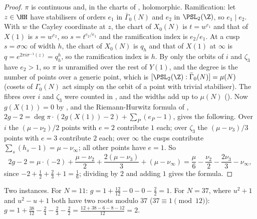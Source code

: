 \begin{proof}
$\pi$ is continuous and, in the charts of , holomorphic. Ramification: let $z\in\HH$ have stabilisers of orders $e_1$ in
$\bar\Gamma_0(N)$ and $e_2$ in $\PSL_2(\Z)$, so $e_1\mid e_2$. With $w$ the Cayley coordinate at $z$, the chart of $X_0(N)$ is $t=w^{e_1}$ and that of $X(1)$ is $s=w^{e_2}$, so
$s=t^{e_2/e_1}$ and the ramification index is $e_2/e_1$. At a cusp $s=\sigma\infty$ of width $h$, the chart of $X_0(N)$ is $q_h$ and that of $X(1)$ at $\infty$ is
$q=e^{2\pi i\sigma^{-1}(z)}=q_h^h$, so the ramification index is $h$. By  only the orbits of $i$ and $\zeta_3$ have $e_2>1$, so $\pi$ is
unramified over the rest of $Y(1)$, and the degree is the number of points over a generic point, which is $[\PSL_2(\Z):\bar\Gamma_0(N)]=\mu(N)$ (cosets of
$\Gamma_0(N)$ act simply on the orbit of a point with trivial stabiliser). The fibres over $i$ and $\zeta_3$ were counted in , and
the widths add up to $\mu(N)$ (). Now $g(X(1))=0$ by , and the Riemann-Hurwitz formula of
, $2g-2=\deg\pi\cdot(2g(X(1))-2)+\sum_P(e_P-1)$, gives the following. Over $i$ the $(\mu-\nu_2)/2$ points with $e=2$ contribute $1$ each; over $\zeta_3$ the
$(\mu-\nu_3)/3$ points with $e=3$ contribute $2$ each; over $\infty$ the cusps contribute $\sum_s(h_s-1)=\mu-\nu_\infty$; all other points have $e=1$. So
\[
2g-2=\mu\cdot(-2)+\frac{\mu-\nu_2}2+\frac{2(\mu-\nu_3)}3+(\mu-\nu_\infty)=\frac\mu6-\frac{\nu_2}2-\frac{2\nu_3}3-\nu_\infty,
\]
since $-2+\frac12+\frac23+1=\frac16$; dividing by $2$ and adding $1$ gives the formula.
\end{proof}

Two instances. For $N=11$: $g=1+\frac{12}{12}-0-0-\frac22=1$. For $N=37$, where $u^2+1$ and $u^2-u+1$ both have two roots modulo $37$ ($37\equiv1\pmod{12}$):
$g=1+\frac{38}{12}-\frac24-\frac23-\frac22=\frac{12+38-6-8-12}{12}=2$.

